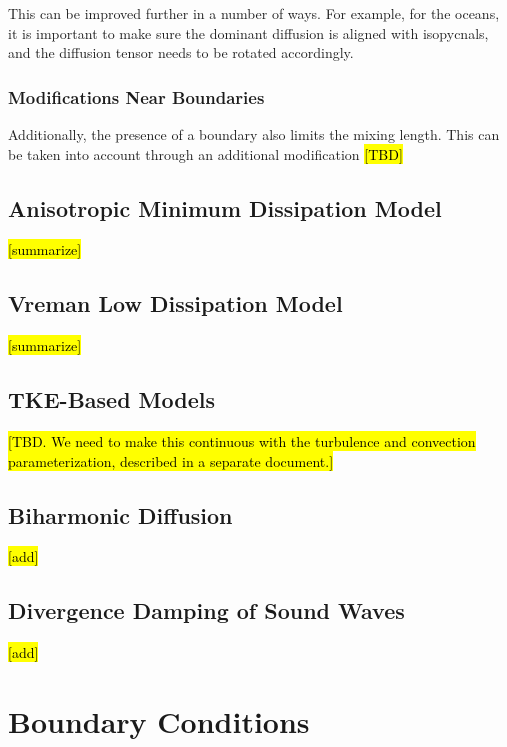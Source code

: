 \documentclass{report}
\begin{document}
This can be improved further in a number of ways. For example, for the oceans, it is important to make sure the dominant diffusion is aligned with isopycnals, and the diffusion tensor needs to be rotated accordingly. 

\subsection{Modifications Near Boundaries}
 
Additionally, the presence of a boundary also limits the mixing length. This can be taken into account through an additional modification \citep{Kleissl03a} \hl{[TBD]}

\section{Anisotropic Minimum Dissipation Model}

\hl{[summarize]}
\citep{Abkar17a}

\section{Vreman Low Dissipation Model}

\citep{vreman2004}

\hl{[summarize]}

\section{TKE-Based Models}

\citep{Deardorff80a}

\hl{[TBD. We need to make this continuous with the turbulence and convection parameterization, described in a separate document.]}


\section{Biharmonic Diffusion}

\hl{[add]}

\section{Divergence Damping of Sound Waves}

\hl{[add]}

\chapter{Boundary Conditions}\label{sct:bc}
\end{document}
